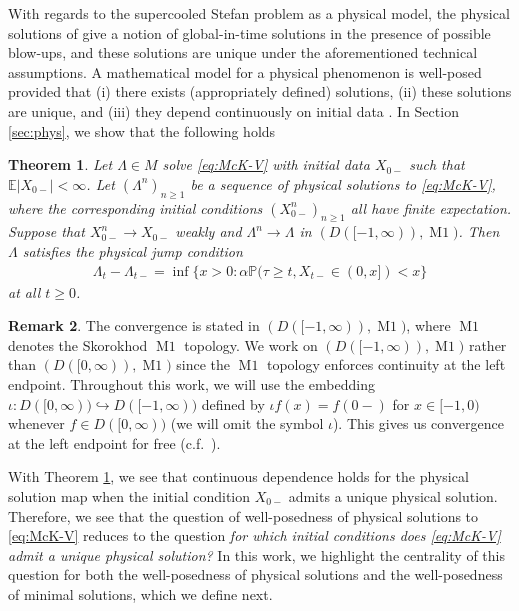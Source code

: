 \documentclass[12pt]{amsart}
\newcommand{\bP}{\mathbb{P}}
\newcommand{\E}{\mathbb{E}}
\theoremstyle{plain}
\newtheorem{thm}{Theorem}[section]
\theoremstyle{definition}
\newtheorem{rmk}[thm]{Remark}
\begin{document}
With regards to the supercooled Stefan problem as a physical model, the physical solutions of \cite{delarue_global_2022} give a notion of global-in-time solutions in the presence of possible blow-ups, and these solutions are unique under the aforementioned technical assumptions.
A mathematical model for a physical phenomenon is well-posed provided that (i) there exists (appropriately defined) solutions, (ii) these solutions are unique, and (iii) they depend continuously on initial data \cite[page 7]{evans_partial_2010}. %
In Section \ref{sec:phys}, we show that the following holds
\begin{thm}
\label{thm:phys}
Let $\Lambda\in M$ solve \eqref{eq:McK-V} with initial data $X_{0-}$ such that $\E|X_{0-}|<\infty$. Let $(\Lambda^n)_{n\ge 1}$ be a sequence of physical solutions to \eqref{eq:McK-V}, where the corresponding initial conditions $(X_{0-}^n)_{n\ge 1}$ all have finite expectation. Suppose that $X_{0-}^n\to X_{0-}$ weakly and $\Lambda^n\to \Lambda$ in $(D([-1,\infty)),\operatorname{M1})$. Then $\Lambda$ satisfies
the physical jump condition
\begin{align}
\Lambda_{t}-\Lambda_{t-}=\inf\{x>0:\alpha\bP(\tau\ge t, X_{t-}\in(0,x])<x\}
\end{align}
at all $t\ge 0$. 
\end{thm}

\begin{rmk}\label{rmk:cheaptrick}
The convergence is stated in $(D([-1,\infty)),\operatorname{M1})$, where $\operatorname{M1}$ denotes the Skorokhod $\operatorname{M1}$ topology. We work on $(D([-1,\infty)),\operatorname{M1})$ rather than $(D([0,\infty)),\operatorname{M1})$ since the $\operatorname{M1}$ topology enforces continuity at the left endpoint. Throughout this work, we will use the embedding $\iota :D([0,\infty))\hookrightarrow D([-1,\infty))$ defined by $\iota f(x)=f(0-)$ for $x\in [-1,0)$ whenever $f\in D([0,\infty))$ (we will omit the symbol $\iota$). This gives us convergence at the left endpoint for free (c.f.~\cite[Remark 4.3]{cuchiero_propagation_2020}). 
\end{rmk}

With Theorem \ref{thm:phys}, we see that continuous dependence holds for the physical solution map when the initial condition $X_{0-}$ admits a unique physical solution. Therefore, we see that the question of well-posedness of physical solutions to \eqref{eq:McK-V} reduces to the question \emph{for which initial conditions does \eqref{eq:McK-V} admit a unique physical solution?} In this work, we highlight the centrality of this question for both the well-posedness of physical solutions and the well-posedness of minimal solutions, which we define next.
\end{document}
